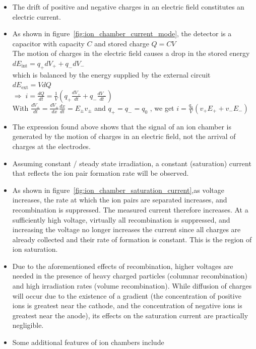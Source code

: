 \begin{itemize}
    \item The drift of positive and negative charges in an electric field constitutes an electric current. 
    \item As shown in figure~\ref{fig:ion_chamber_current_mode}, the detector is a capacitor with capacity $C$ and stored charge $Q=CV$\\
    The motion of charges in the electric field causes a drop in the stored energy\\ $dE_\text{int}=q_+dV_++q_-dV_-$\\
    which is balanced by the energy supplied by the external circuit\\
    $dE_\text{ext}=VdQ$\\
    $\Rightarrow\;i=\frac{dQ}{dt}=\frac{1}{V}\left(q_+\frac{dV_+}{dt}+q_-\frac{dV_-}{dt}\right)$\\
    With $\frac{dV_\pm}{dt}=\frac{dV_\pm}{dx}\frac{dx}{dt}=E_\pm v_\pm$ and $q_+=q_-=q_0$ , we get $i=\frac{q_0}{V}(v_+E_++v_-E_-)$
    \item The expression found above shows that the signal of an ion chamber is generated by the motion of charges in an electric field, not the arrival of charges at the electrodes.
    \item Assuming constant / steady state irradiation, a constant (saturation) current that reflects the ion pair formation rate will be observed.
    \item As shown in figure~\ref{fig:ion_chamber_saturation_current},as voltage increases, the rate at which the ion pairs are separated increases, and recombination is suppressed. The measured current therefore increases. At a sufficiently high voltage, virtually all recombination is suppressed, and increasing the voltage no longer increases the current since all charges are already collected and their rate of formation is constant. This is the region of ion saturation. 
    \item Due to the aforementioned effects of recombination, higher voltages are needed in the presence of heavy charged particles (columnar recombination) and high irradiation rates (volume recombination). While diffusion of charges will occur due to the existence of a gradient (the concentration of positive ions is greatest near the cathode, and the concentration of negative ions is greatest near the anode), its effects on the saturation current are practically negligible. 
    \item Some additional features of ion chambers include

\end{itemize}

